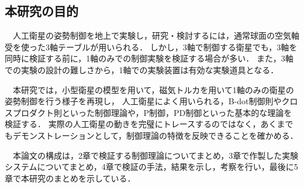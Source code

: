 \subsection{本研究の目的}
　人工衛星の姿勢制御を地上で実験し，研究・検討するには，通常球面の空気軸受を使った3軸テーブルが用いられる．
しかし，3軸で制御する衛星でも，3軸を同時に検証する前に，1軸のみでの制御実験を検証する場合が多い\cite{intro6}．
また，3軸での実験の設計の難しさから，1軸での実験装置は有効な実験道具となる．

　本研究では，小型衛星の模型を用いて，磁気トルカを用いて1軸のみの衛星の姿勢制御を行う様子を再現し，
人工衛星によく用いられる，B-dot制御則やクロスプロダクト則といった制御理論や，P制御，PD制御といった基本的な理論を検証する．
実際の人工衛星の動きを完璧にトレースするのではなく，あくまでもデモンストレーションとして，制御理論の特徴を反映できることを確かめる．

　本論文の構成は，2章で検証する制御理論についてまとめ，3章で作製した実験システムについてまとめ，4章で検証の手法，結果を示し，考察を行い，最後に5章で本研究のまとめを示している．
